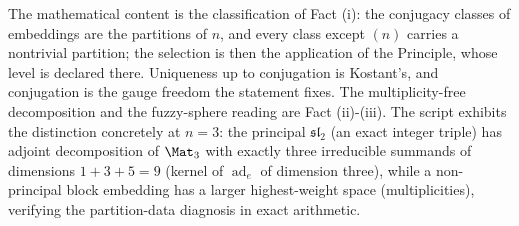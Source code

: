 The mathematical content is the classification of Fact (i): the conjugacy classes of embeddings are the partitions of $n$, and every class except $(n)$ carries a nontrivial partition; the selection is then the application of the Principle, whose level is declared there. Uniqueness up to conjugation is Kostant's, and conjugation is the gauge freedom the statement fixes. The multiplicity-free decomposition and the fuzzy-sphere reading are Fact (ii)-(iii). The script exhibits the distinction concretely at $n = 3$: the principal $\mathfrak{sl}_2$ (an exact integer triple) has adjoint decomposition of $\Mat_3$ with exactly three irreducible summands of dimensions $1 + 3 + 5 = 9$ (kernel of $\operatorname{ad}_e$ of dimension three), while a non-principal block embedding has a larger highest-weight space (multiplicities), verifying the partition-data diagnosis in exact arithmetic.
